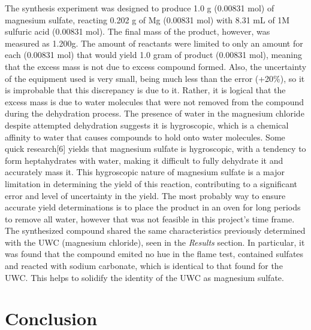 \documentclass[12pt]{article}
\begin{document}
The synthesis experiment was designed to produce 1.0 g (0.00831 mol) of magnesium sulfate, reacting 0.202 g of Mg (0.00831 mol) with 8.31 mL of 1M sulfuric acid (0.00831 mol). The final mass of the product, however, was measured as 1.200g. The amount of reactants were limited to only an amount for each (0.00831 mol) that would yield 1.0 gram of  product (0.00831 mol), meaning that the excess mass is not due to excess compound formed. Also, the uncertainty of the equipment used is very small, being much less than the error (+20\%), so it is improbable that this discrepancy is due to it. Rather, it is logical that the excess mass is due to water molecules that were not removed from the compound during the dehydration process. The presence of water in the magnesium chloride despite attempted dehydration suggests it is hygroscopic, which is a chemical affinity to water that causes compounds to hold onto water molecules. Some quick research[6] yields that magnesium sulfate is hygroscopic, with a tendency to form heptahydrates with water, making it difficult to fully dehydrate it and accurately mass it. This hygroscopic nature of magnesium sulfate is a major limitation in determining the yield of this reaction, contributing to a significant error and level of uncertainty in the yield. The most probably way to ensure accurate yield determinations is to place the product in an oven for long periods to remove all water, however that was not feasible in this project's time frame.
\vspace{6pt}\\The synthesized compound shared the same characteristics previously determined with the UWC (magnesium chloride), seen in the \textit{Results} section. In particular, it was found that the compound emited no hue in the flame test, contained sulfates and reacted with sodium carbonate, which is identical to that found for the UWC. This helps to solidify the identity of the UWC as magnesium sulfate. 



\section{Conclusion}
\end{document}
